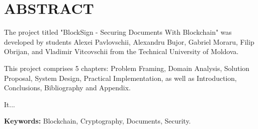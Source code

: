 \chapter*{ABSTRACT}
\thispagestyle{empty}

The project titled "BlockSign - Securing Documents With Blockchain" was developed by students Alexei Pavlovschii, Alexandru Bujor, Gabriel Moraru, Filip Obrijan, and Vladimir Vitcovschii from the Technical University of Moldova.

This project comprises 5 chapters: Problem Framing, Domain Analysis, Solution Proposal, System Design, Practical Implementation, as well as Introduction, Conclusions, Bibliography and Appendix.

It...

\textbf{Keywords: } Blockchain, Cryptography, Documents, Security.
